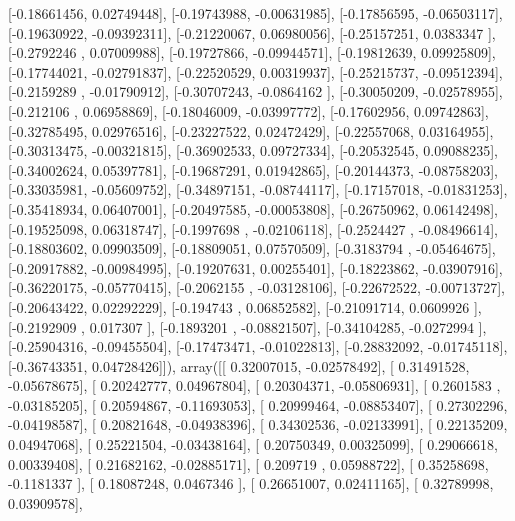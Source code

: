 \documentclass{article}
\begin{document}
       [-0.18661456,  0.02749448],
       [-0.19743988, -0.00631985],
       [-0.17856595, -0.06503117],
       [-0.19630922, -0.09392311],
       [-0.21220067,  0.06980056],
       [-0.25157251,  0.0383347 ],
       [-0.2792246 ,  0.07009988],
       [-0.19727866, -0.09944571],
       [-0.19812639,  0.09925809],
       [-0.17744021, -0.02791837],
       [-0.22520529,  0.00319937],
       [-0.25215737, -0.09512394],
       [-0.2159289 , -0.01790912],
       [-0.30707243, -0.0864162 ],
       [-0.30050209, -0.02578955],
       [-0.212106  ,  0.06958869],
       [-0.18046009, -0.03997772],
       [-0.17602956,  0.09742863],
       [-0.32785495,  0.02976516],
       [-0.23227522,  0.02472429],
       [-0.22557068,  0.03164955],
       [-0.30313475, -0.00321815],
       [-0.36902533,  0.09727334],
       [-0.20532545,  0.09088235],
       [-0.34002624,  0.05397781],
       [-0.19687291,  0.01942865],
       [-0.20144373, -0.08758203],
       [-0.33035981, -0.05609752],
       [-0.34897151, -0.08744117],
       [-0.17157018, -0.01831253],
       [-0.35418934,  0.06407001],
       [-0.20497585, -0.00053808],
       [-0.26750962,  0.06142498],
       [-0.19525098,  0.06318747],
       [-0.1997698 , -0.02106118],
       [-0.2524427 , -0.08496614],
       [-0.18803602,  0.09903509],
       [-0.18809051,  0.07570509],
       [-0.3183794 , -0.05464675],
       [-0.20917882, -0.00984995],
       [-0.19207631,  0.00255401],
       [-0.18223862, -0.03907916],
       [-0.36220175, -0.05770415],
       [-0.2062155 , -0.03128106],
       [-0.22672522, -0.00713727],
       [-0.20643422,  0.02292229],
       [-0.194743  ,  0.06852582],
       [-0.21091714,  0.0609926 ],
       [-0.2192909 ,  0.017307  ],
       [-0.1893201 , -0.08821507],
       [-0.34104285, -0.0272994 ],
       [-0.25904316, -0.09455504],
       [-0.17473471, -0.01022813],
       [-0.28832092, -0.01745118],
       [-0.36743351,  0.04728426]]), array([[ 0.32007015, -0.02578492],
       [ 0.31491528, -0.05678675],
       [ 0.20242777,  0.04967804],
       [ 0.20304371, -0.05806931],
       [ 0.2601583 , -0.03185205],
       [ 0.20594867, -0.11693053],
       [ 0.20999464, -0.08853407],
       [ 0.27302296, -0.04198587],
       [ 0.20821648, -0.04938396],
       [ 0.34302536, -0.02133991],
       [ 0.22135209,  0.04947068],
       [ 0.25221504, -0.03438164],
       [ 0.20750349,  0.00325099],
       [ 0.29066618,  0.00339408],
       [ 0.21682162, -0.02885171],
       [ 0.209719  ,  0.05988722],
       [ 0.35258698, -0.1181337 ],
       [ 0.18087248,  0.0467346 ],
       [ 0.26651007,  0.02411165],
       [ 0.32789998,  0.03909578],
\end{document}

